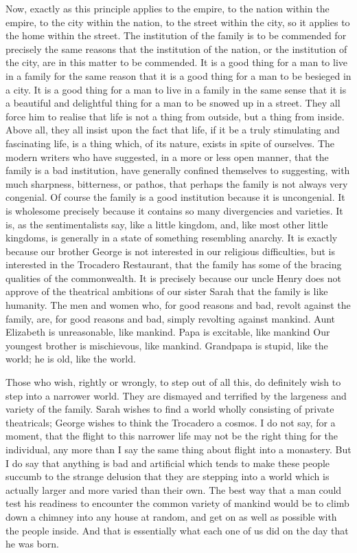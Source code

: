 Now, exactly as this principle applies to the empire, to the nation within the empire, to the city within the nation, to the street within the city, so it applies to the home within the street. The institution of the family is to be commended for precisely the same reasons that the institution of the nation, or the institution of the city, are in this matter to be commended. It is a good thing for a man to live in a family for the same reason that it is a good thing for a man to be besieged in a city. It is a good thing for a man to live in a family in the same sense that it is a beautiful and delightful thing for a man to be snowed up in a street. They all force him to realise that life is not a thing from outside, but a thing from inside. Above all, they all insist upon the fact that life, if it be a truly stimulating and fascinating life, is a thing which, of its nature, exists in spite of ourselves. The modern writers who have suggested, in a more or less open manner, that the family is a bad institution, have generally confined themselves to suggesting, with much sharpness, bitterness, or pathos, that perhaps the family is not always very congenial. Of course the family is a good institution because it is uncongenial. It is wholesome precisely because it contains so many divergencies and varieties. It is, as the sentimentalists say, like a little kingdom, and, like most other little kingdoms, is generally in a state of something resembling anarchy. It is exactly because our brother George is not interested in our religious difficulties, but is interested in the Trocadero Restaurant, that the family has some of the bracing qualities of the commonwealth. It is precisely because our uncle Henry does not approve of the theatrical ambitions of our sister Sarah that the family is like humanity. The men and women who, for good reasons and bad, revolt against the family, are, for good reasons and bad, simply revolting against mankind. Aunt Elizabeth is unreasonable, like mankind. Papa is excitable, like mankind Our youngest brother is mischievous, like mankind. Grandpapa is stupid, like the world; he is old, like the world.

Those who wish, rightly or wrongly, to step out of all this, do definitely wish to step into a narrower world. They are dismayed and terrified by the largeness and variety of the family. Sarah wishes to find a world wholly consisting of private theatricals; George wishes to think the Trocadero a cosmos. I do not say, for a moment, that the flight to this narrower life may not be the right thing for the individual, any more than I say the same thing about flight into a monastery. But I do say that anything is bad and artificial which tends to make these people succumb to the strange delusion that they are stepping into a world which is actually larger and more varied than their own. The best way that a man could test his readiness to encounter the common variety of mankind would be to climb down a chimney into any house at random, and get on as well as possible with the people inside. And that is essentially what each one of us did on the day that he was born.

